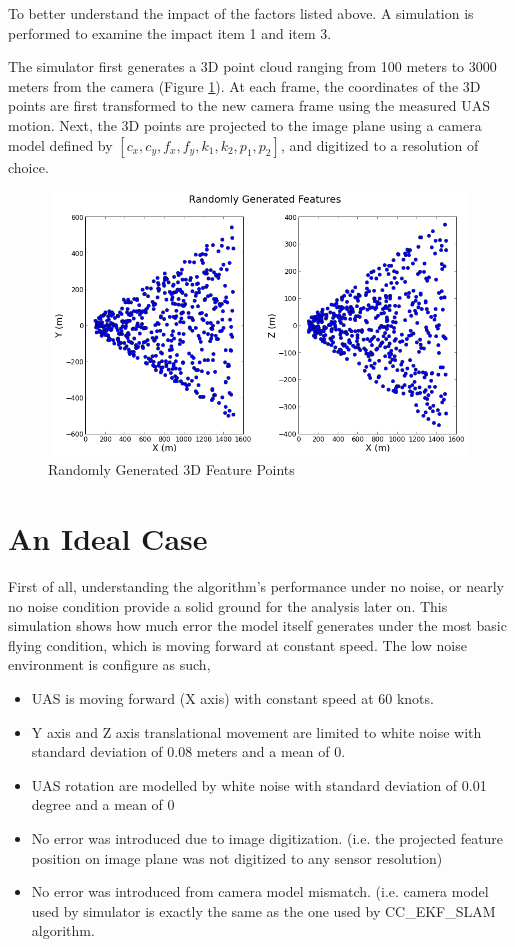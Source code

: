 To better understand the impact of the factors listed above. A 
simulation is performed to examine the impact item 1 and item 3. 

The simulator first generates a 3D point cloud ranging from 100 meters
to 3000 meters from the camera (Figure \ref{fig:simfig51}). At each
frame, the coordinates of the 3D points are first transformed to the
new camera frame using the measured UAS motion. Next, the 3D points
are projected to the image plane using a camera model defined by
$[c_{x}, c_{y}, f_{x}, f_{y}, k_{1}, k_{2}, p_{1}, p_{2}]$, and
digitized to a resolution of choice.

\begin{figure}[h]
\centering
\includegraphics[width=12cm, height=7cm]{./Figures/SimulationFigures/Figure51.png}
\caption{Randomly Generated 3D Feature Points}
\label{fig:simfig51}
\end{figure}

\section{An Ideal Case}
First of all, understanding the algorithm's performance under no noise, 
or nearly no noise condition provide a solid ground for the analysis 
later on. This simulation shows how much error the model itself 
generates under the most basic flying condition, which is moving forward 
at constant speed. The low noise environment is configure as such,

\begin{itemize}
  \item UAS is moving forward (X axis) with constant speed at 60 knots. 
  \item Y axis and Z axis translational movement are limited to white
  noise with standard deviation of 0.08 meters and a mean of 0.
  \item UAS rotation are modelled by white noise with standard
  deviation of 0.01 degree and a mean of 0
  \item No error was introduced due to image digitization. (i.e. the
  projected feature position on image plane was not digitized to any
  sensor resolution)
  \item No error was introduced from camera model mismatch. (i.e.
  camera model used by simulator is exactly the same as the one used
  by CC\_EKF\_SLAM algorithm.
\end{itemize}

